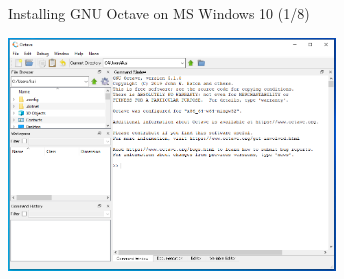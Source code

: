 \begin{frame}{Installing GNU Octave on MS Windows 10 (1/8)}
\begin{center}
\includegraphics[width=0.65\textwidth]{res/ms_windows/win_octave_gui.png}
\end{center}
\end{frame}



